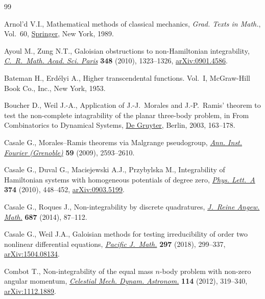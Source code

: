 \documentclass[10pt,a4paper]{amsart}
\numberwithin{equation}{section}
\begin{document}
\begin{thebibliography}{99}
\footnotesize\itemsep=0pt

Arnol'd V.I., Mathematical methods of classical mechanics, \textit{Grad. Texts
 in Math.}, Vol.~60, \href{https://doi.org/10.1007/978-1-4757-2063-1}{Springer}, New York, 1989.

Ayoul M., Zung N.T., Galoisian obstructions to non-{H}amiltonian integrability,
 \href{https://doi.org/10.1016/j.crma.2010.10.024}{\textit{C.~R.~Math. Acad. Sci. Paris}} \textbf{348} (2010), 1323--1326,
 \href{https://arxiv.org/abs/0901.4586}{arXiv:0901.4586}.

Bateman H., Erd\'elyi A., Higher transcendental functions. {V}ol.~{I},
 McGraw-Hill Book Co., Inc., New York, 1953.

Boucher D., Weil J.-A., Application of J.-J.~Morales and J.-P.~Ramis' theorem to
 test the non-complete intagrability of the planar three-body problem, in From
 Combinatorics to Dynamical Systems, \href{https://doi.org/10.1515/9783110200003.163}{De Gruyter}, Berlin, 2003, 163--178.

Casale G., {M}orales--{R}amis theorems via {M}algrange pseudogroup,
 \href{https://doi.org/10.5802/aif.2501}{\textit{Ann. Inst. Fourier (Grenoble)}} \textbf{59} (2009), 2593--2610.

Casale G., Duval G., Maciejewski A.J., Przybylska M., Integrability of
 {H}amiltonian systems with homogeneous potentials of degree zero,
 \href{https://doi.org/10.1016/j.physleta.2009.11.018}{\textit{Phys. Lett.~A}} \textbf{374} (2010), 448--452, \href{https://arxiv.org/abs/0903.5199}{arXiv:0903.5199}.

Casale G., Roques J., Non-integrability by discrete quadratures,
 \href{https://doi.org/10.1515/crelle-2012-0054}{\textit{J.~Reine Angew. Math.}} \textbf{687} (2014), 87--112.

Casale G., Weil J.A., Galoisian methods for testing irreducibility of order two
 nonlinear differential equations, \href{https://doi.org/10.2140/pjm.2018.297.299}{\textit{Pacific J.~Math.}} \textbf{297}
 (2018), 299--337, \href{https://arxiv.org/abs/1504.08134}{arXiv:1504.08134}.

Combot T., Non-integrability of the equal mass {$n$}-body problem with non-zero
 angular momentum, \href{https://doi.org/10.1007/s10569-012-9417-z}{\textit{Celestial Mech. Dynam. Astronom.}} \textbf{114}
 (2012), 319--340, \href{https://arxiv.org/abs/1112.1889}{arXiv:1112.1889}.


\end{thebibliography}
\end{document}
